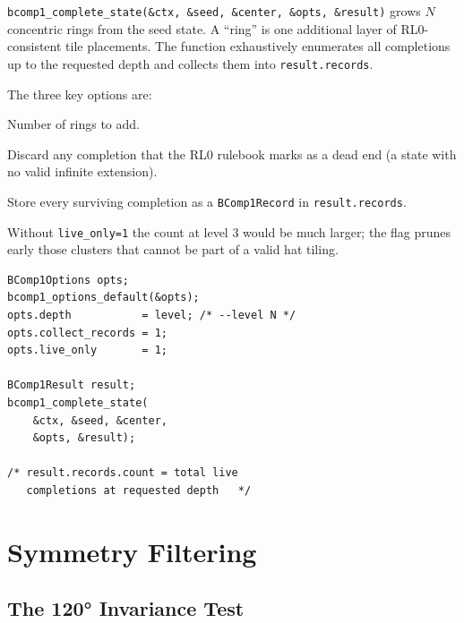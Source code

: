 \documentclass[10pt,a4paper]{article}
\let\polysection\section
\renewcommand\section{\needspace{0.16\textheight}\polysection}
\let\polysubsection\subsection
\renewcommand\subsection{\needspace{0.12\textheight}\polysubsection}
\newcommand{\code}[1]{\texttt{\small #1}}
\begin{document}
\begin{tcolorbox}[dualbox, title={\code{bcomp1\_complete\_state} — growth options}]
  \code{bcomp1\_complete\_state(\&ctx, \&seed, \&center, \&opts, \&result)}
  grows $N$ concentric rings from the seed state.  A ``ring'' is one
  additional layer of RL0-consistent tile placements.  The function
  exhaustively enumerates all completions up to the requested depth and
  collects them into \code{result.records}.

  The three key options are:
  \begin{description}[leftmargin=0pt,style=nextline]
    \item[\code{depth = N}]  Number of rings to add.
    \item[\code{live\_only = 1}]  Discard any completion that the RL0
      rulebook marks as a dead end (a state with no valid infinite
      extension).
    \item[\code{collect\_records = 1}]  Store every surviving completion
      as a \code{BComp1Record} in \code{result.records}.
  \end{description}
  Without \code{live\_only=1} the count at level 3 would be much larger;
  the flag prunes early those clusters that cannot be part of a valid
  hat tiling.
\tcblower
\begin{verbatim}
BComp1Options opts;
bcomp1_options_default(&opts);
opts.depth           = level; /* --level N */
opts.collect_records = 1;
opts.live_only       = 1;

BComp1Result result;
bcomp1_complete_state(
    &ctx, &seed, &center,
    &opts, &result);

/* result.records.count = total live
   completions at requested depth   */
\end{verbatim}
\end{tcolorbox}

\section{Symmetry Filtering}

\subsection{The 120° Invariance Test}
\end{document}
